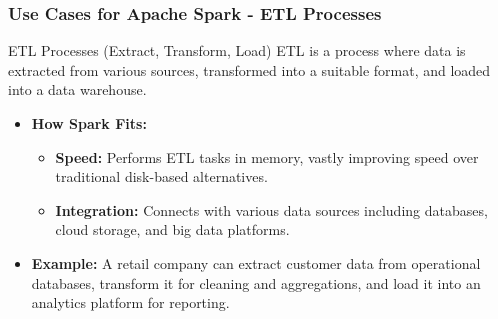 \documentclass{beamer}
\begin{document}
\begin{frame}[fragile]
    \frametitle{Use Cases for Apache Spark - ETL Processes}
    \begin{block}{ETL Processes (Extract, Transform, Load)}
        ETL is a process where data is extracted from various sources, transformed into a suitable format, and loaded into a data warehouse.
    \end{block}
    \begin{itemize}
        \item \textbf{How Spark Fits:}
        \begin{itemize}
            \item \textbf{Speed:} Performs ETL tasks in memory, vastly improving speed over traditional disk-based alternatives.
            \item \textbf{Integration:} Connects with various data sources including databases, cloud storage, and big data platforms.
        \end{itemize}
        \item \textbf{Example:} A retail company can extract customer data from operational databases, transform it for cleaning and aggregations, and load it into an analytics platform for reporting.
    \end{itemize}
\end{frame}
\end{document}
